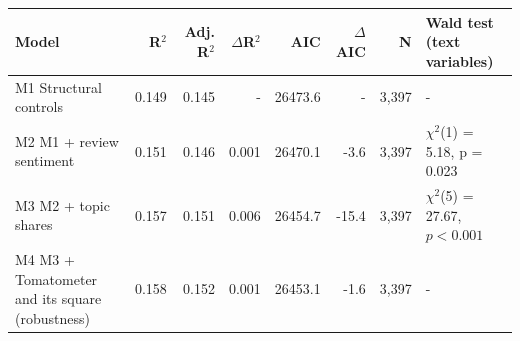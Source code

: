 \begin{tabular}{lrrrrrrl}
\toprule
Model & R$^2$ & Adj. R$^2$ & $\Delta$R$^2$ & AIC & $\Delta$AIC & N & Wald test (text variables) \\
\midrule
M1  Structural controls & 0.149 & 0.145 & - & 26473.6 & - & 3,397 & - \\
M2  M1 + review sentiment & 0.151 & 0.146 & 0.001 & 26470.1 & -3.6 & 3,397 & $\chi^2$(1) = 5.18, p = 0.023 \\
M3  M2 + topic shares & 0.157 & 0.151 & 0.006 & 26454.7 & -15.4 & 3,397 & $\chi^2$(5) = 27.67, $p<0.001$ \\
M4  M3 + Tomatometer and its square (robustness) & 0.158 & 0.152 & 0.001 & 26453.1 & -1.6 & 3,397 & - \\
\bottomrule
\end{tabular}
